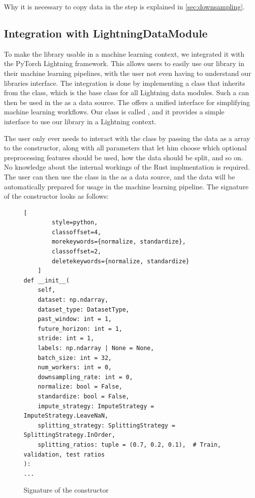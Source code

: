 \documentclass[review]{AIM_report}
\begin{document}
Why it is necessary to copy data in the \downsample step is explained in \autoref{sec:downsampling}.

\subsection{Integration with LightningDataModule}

To make the library usable in a machine learning context, we integrated it with the PyTorch Lightning framework. This allows users to easily use our library in their machine learning pipelines, with the user not even having to understand our libraries interface. The integration is done by implementing a class that inherits from the \lightningDM class, which is the base class for all Lightning data modules. Such a \lightningDM can then be used in the \lightningModule as a data source. The \lightningModule offers a unified interface for simplifying machine learning workflows. Our class is called \rustDM, and it provides a simple interface to use our library in a Lightning context.

The user only ever needs to interact with the \rustDM class by passing the data as a \numpy array to the constructor, along with all parameters that let him choose which optional preprocessing features should be used, how the data should be split, and so on. No knowledge about the internal workings of the Rust implmentation is required. The user can then use the \rustDM class in the \lightningModule as a data source, and the data will be automatically prepared for usage in the machine learning pipeline. The signature of the \rustDM constructor looks as follows:

\begin{figure}[H]
    \begin{lstlisting}[
        style=python, 
        classoffset=4, 
        morekeywords={normalize, standardize}, 
        classoffset=2, 
        deletekeywords={normalize, standardize}
    ]
def __init__(
    self,
    dataset: np.ndarray,
    dataset_type: DatasetType,
    past_window: int = 1,
    future_horizon: int = 1,
    stride: int = 1,
    labels: np.ndarray | None = None,
    batch_size: int = 32,
    num_workers: int = 0,
    downsampling_rate: int = 0,
    normalize: bool = False,
    standardize: bool = False,
    impute_strategy: ImputeStrategy = ImputeStrategy.LeaveNaN,
    splitting_strategy: SplittingStrategy = SplittingStrategy.InOrder,
    splitting_ratios: tuple = (0.7, 0.2, 0.1),  # Train, validation, test ratios
):
...
    \end{lstlisting}
    \caption{Signature of the \rustDM constructor}
    \label{fig:rustdm-signature}
\end{figure}
\end{document}
